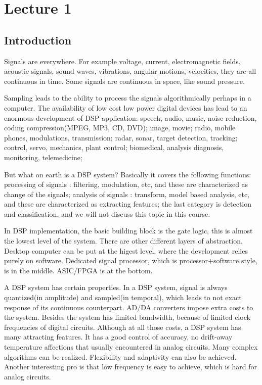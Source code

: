 
\chapter*{Lecture 1}

\section*{Introduction}

Signals are everywhere. For example voltage, current, electromagnetic fields, acoustic signals, sound waves, 
vibrations, angular motions, velocities, they are all continuous in time. Some signals are continuous in space,
like sound pressure. 

Sampling leads to the ability to process the signals algorithmically perhaps in a computer. The availability of low 
cost low power digital devices has lead to an enormous development of DSP application:
 speech, audio, music, noise reduction, coding compression(MPEG, MP3, CD, DVD);
 image, movie;
 radio, mobile phones, modulations, transmission;
 radar, sonar, target detection, tracking;
 control, servo, mechanics, plant control;
 biomedical, analysis diagnosis, monitoring, telemedicine;

But what on earth is a DSP system? Basically it covers the following functions:
processing of signals : filtering, modulation, etc, and these are characterized as change of the signals;
analysis of signals : transform, model based analysis, etc, and these are characterized as extracting features;
the last category is detection and classification, and we will not discuss this topic in this course.

In DSP implementation, the basic building block is the gate logic, this is almost the lowest level of the system. 
There are other different layers of abstraction. Desktop computer can be put at the higest level, 
where the development relies purely on software. Dedicated signal processor, which is processor$+$software style,
is in the middle. ASIC/FPGA is at the bottom. 

A DSP system has certain properties. In a DSP system, signal is always quantized(in amplitude) and 
sampled(in temporal), which leads to not exact response of its continuous counterpart. 
AD/DA converters impose extra costs to the system. 
Besides the system has limited bandwidth, because of limited clock frequencies of digital circuits.
Although at all those costs, a DSP system has many attracting features. It has a good control of accuracy, 
no drift-away temperature affections that usually encountered in analog circuits. 
Many complex algorithms can be realized. Flexibility and adaptivity can also be achieved. 
Another interesting pro is that low frequency is easy to achieve, which is hard for analog circuits.

